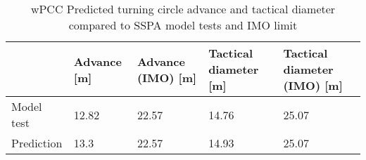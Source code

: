 \begin{table}[!htb]
    \footnotesize
    \caption{wPCC Predicted turning circle advance and tactical diameter compared to SSPA model tests and IMO limit}
    \label{\detokenize{06.10_results_wpcc:tab-wpcc-advance}}
    \centering
    \begin{tabular}{|T|T|T|T|T|}
\hline
&

Advance {[}m{]}
&

Advance (IMO) {[}m{]}
&

Tactical diameter {[}m{]}
&

Tactical diameter (IMO) {[}m{]}
\\
\hline

Model test
&

12.82
&

22.57
&

14.76
&

25.07
\\

Prediction
&

13.3
&

22.57
&

14.93
&

25.07
\\
\hline
\end{tabular}

\end{table}

